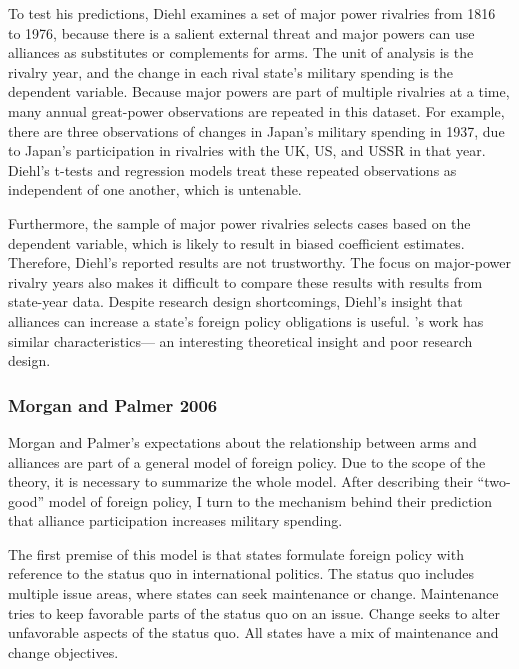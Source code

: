 \documentclass[12pt]{article}
\begin{document}
To test his predictions, Diehl examines a set of major power rivalries from 1816 to 1976, because there is a salient external threat and major powers can use alliances as substitutes or complements for arms.
The unit of analysis is the rivalry year, and the change in each rival state's military spending is the dependent variable. 
Because major powers are part of multiple rivalries at a time, many annual great-power observations are repeated in this dataset. 
For example, there are three observations of changes in Japan's military spending in 1937, due to Japan's participation in rivalries with the UK, US, and USSR in that year. %
Diehl's t-tests and regression models treat these repeated observations as independent of one another, which is untenable. 


Furthermore, the sample of major power rivalries selects cases based on the dependent variable, which is likely to result in biased coefficient estimates. 
Therefore, Diehl's reported results are not trustworthy. 
The focus on major-power rivalry years also makes it difficult to compare these results with results from state-year data. 
Despite research design shortcomings, Diehl's insight that alliances can increase a state's foreign policy obligations is useful.  
\citet{MorganPalmer2006}'s work has similar characteristics--- an interesting theoretical insight and poor research design. 



\subsubsection{Morgan and Palmer 2006}


Morgan and Palmer's expectations about the relationship between arms and alliances are part of a general model of foreign policy. 
Due to the scope of the theory, it is necessary to summarize the whole model. 
After describing their ``two-good'' model of foreign policy, I turn to the mechanism behind their prediction that alliance participation increases military spending. 


The first premise of this model is that states formulate foreign policy with reference to the status quo in international politics. 
The status quo includes multiple issue areas, where states can seek maintenance or change. 
Maintenance tries to keep favorable parts of the status quo on an issue.
Change seeks to alter unfavorable aspects of the status quo.
All states have a mix of maintenance and change objectives. 
\end{document}
